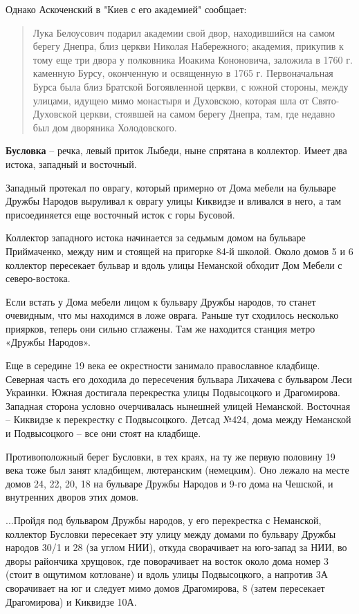 Однако Аскоченский в "Киев с его академией" сообщает:

\begin{quotation}
Лука Белоусович подарил академии свой двор, находившийся на самом берегу Днепра, близ церкви Николая Набережного; академия, прикупив к тому еще три двора у полковника Иоакима Кононовича, заложила в 1760 г. каменную Бурсу, оконченную и освященную в 1765 г. Первоначальная Бурса была близ Братской Богоявленной церкви, с южной стороны, между улицами, идущею мимо монастыря и Духовскою, которая шла от Свято-Духовской церкви, стоявшей на самом берегу Днепра, там, где недавно был дом дворяника Холодовского.\end{quotation}


\textbf{Бусловка} – речка, левый приток Лыбеди, ныне спрятана в коллектор. Имеет два истока, западный и восточный.

Западный протекал по оврагу, который примерно от Дома мебели на бульваре Дружбы Народов выруливал к оврагу улицы Киквидзе и вливался в него, а там присоединяется еще восточный исток с горы Бусовой.

Коллектор западного истока начинается за седьмым домом на бульваре Приймаченко, между ним и стоящей на пригорке 84-й школой. Около домов 5 и 6 коллектор пересекает бульвар и вдоль улицы Неманской обходит Дом Мебели с северо-востока.

Если встать у Дома мебели лицом к бульвару Дружбы народов, то станет очевидным, что мы находимся в ложе оврага. Раньше тут сходилось несколько приярков, теперь они сильно сглажены. Там же находится станция метро «Дружбы Народов». 

Еще в середине 19 века ее окрестности занимало православное кладбище. Северная часть его доходила до пересечения бульвара Лихачева с бульваром Леси Украинки. Южная достигала перекрестка улицы Подвысоцкого и Драгомирова. Западная сторона условно очерчивалась нынешней улицей Неманской. Восточная – Киквидзе к перекрестку с Подвысоцкого. Детсад №424, дома между Неманской и Подвысоцкого – все они стоят на кладбище.

Противоположный берег Бусловки, в тех краях, на ту же первую половину 19 века тоже был занят кладбищем, лютеранским (немецким). Оно лежало на месте домов 24, 22, 20, 18 на бульваре Дружбы Народов и 9-го дома на Чешской, и внутренних дворов этих домов.

...Пройдя под бульваром Дружбы народов, у его перекрестка с Неманской, коллектор Бусловки пересекает эту улицу между домами по бульвару Дружбы народов 30/1 и 28 (за углом НИИ), откуда сворачивает на юго-запад за НИИ, во дворы райончика хрущовок, где поворачивает на восток около дома номер 3 (стоит в ощутимом котловане) и вдоль улицы Подвысоцкого, а напротив 3А сворачивает на юг и следует мимо домов Драгомирова, 8 (затем пересекает Драгомирова) и Киквидзе 10А.

